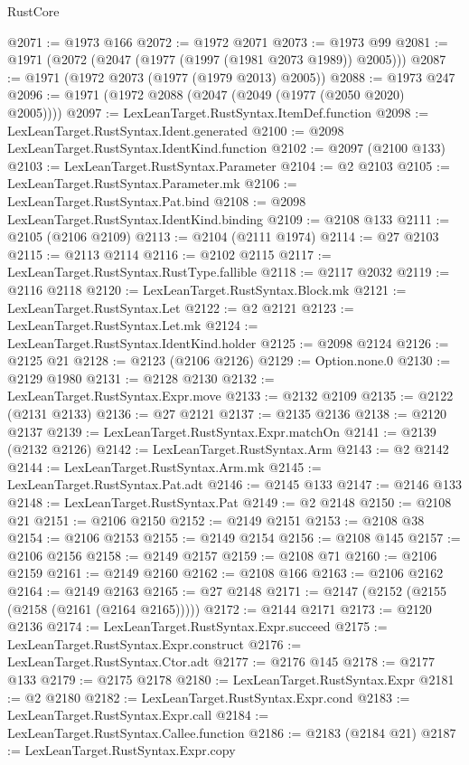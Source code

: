 \begin{lexlean}{RustCore}
\begin{coremodule}
@2071 := @1973 @166
@2072 := @1972 @2071
@2073 := @1973 @99
@2081 := @1971 (@2072 (@2047 (@1977 (@1997 (@1981 @2073 @1989)) @2005)))
@2087 := @1971 (@1972 @2073 (@1977 (@1979 @2013) @2005))
@2088 := @1973 @247
@2096 := @1971 (@1972 @2088 (@2047 (@2049 (@1977 (@2050 @2020) @2005))))
@2097 := LexLeanTarget.RustSyntax.ItemDef.function
@2098 := LexLeanTarget.RustSyntax.Ident.generated
@2100 := @2098 LexLeanTarget.RustSyntax.IdentKind.function
@2102 := @2097 (@2100 @133)
@2103 := LexLeanTarget.RustSyntax.Parameter
@2104 := @2 @2103
@2105 := LexLeanTarget.RustSyntax.Parameter.mk
@2106 := LexLeanTarget.RustSyntax.Pat.bind
@2108 := @2098 LexLeanTarget.RustSyntax.IdentKind.binding
@2109 := @2108 @133
@2111 := @2105 (@2106 @2109)
@2113 := @2104 (@2111 @1974)
@2114 := @27 @2103
@2115 := @2113 @2114
@2116 := @2102 @2115
@2117 := LexLeanTarget.RustSyntax.RustType.fallible
@2118 := @2117 @2032
@2119 := @2116 @2118
@2120 := LexLeanTarget.RustSyntax.Block.mk
@2121 := LexLeanTarget.RustSyntax.Let
@2122 := @2 @2121
@2123 := LexLeanTarget.RustSyntax.Let.mk
@2124 := LexLeanTarget.RustSyntax.IdentKind.holder
@2125 := @2098 @2124
@2126 := @2125 @21
@2128 := @2123 (@2106 @2126)
@2129 := Option.none.{0}
@2130 := @2129 @1980
@2131 := @2128 @2130
@2132 := LexLeanTarget.RustSyntax.Expr.move
@2133 := @2132 @2109
@2135 := @2122 (@2131 @2133)
@2136 := @27 @2121
@2137 := @2135 @2136
@2138 := @2120 @2137
@2139 := LexLeanTarget.RustSyntax.Expr.matchOn
@2141 := @2139 (@2132 @2126)
@2142 := LexLeanTarget.RustSyntax.Arm
@2143 := @2 @2142
@2144 := LexLeanTarget.RustSyntax.Arm.mk
@2145 := LexLeanTarget.RustSyntax.Pat.adt
@2146 := @2145 @133
@2147 := @2146 @133
@2148 := LexLeanTarget.RustSyntax.Pat
@2149 := @2 @2148
@2150 := @2108 @21
@2151 := @2106 @2150
@2152 := @2149 @2151
@2153 := @2108 @38
@2154 := @2106 @2153
@2155 := @2149 @2154
@2156 := @2108 @145
@2157 := @2106 @2156
@2158 := @2149 @2157
@2159 := @2108 @71
@2160 := @2106 @2159
@2161 := @2149 @2160
@2162 := @2108 @166
@2163 := @2106 @2162
@2164 := @2149 @2163
@2165 := @27 @2148
@2171 := @2147 (@2152 (@2155 (@2158 (@2161 (@2164 @2165)))))
@2172 := @2144 @2171
@2173 := @2120 @2136
@2174 := LexLeanTarget.RustSyntax.Expr.succeed
@2175 := LexLeanTarget.RustSyntax.Expr.construct
@2176 := LexLeanTarget.RustSyntax.Ctor.adt
@2177 := @2176 @145
@2178 := @2177 @133
@2179 := @2175 @2178
@2180 := LexLeanTarget.RustSyntax.Expr
@2181 := @2 @2180
@2182 := LexLeanTarget.RustSyntax.Expr.cond
@2183 := LexLeanTarget.RustSyntax.Expr.call
@2184 := LexLeanTarget.RustSyntax.Callee.function
@2186 := @2183 (@2184 @21)
@2187 := LexLeanTarget.RustSyntax.Expr.copy

\end{coremodule}
\end{lexlean}
